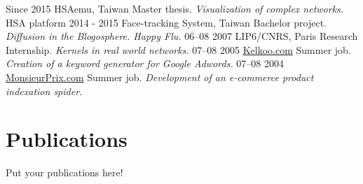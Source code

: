 \documentclass[]{friggeri-cv}
\begin{document}
\begin{entrylist}
  \entry
    {Since 2015}
    {HSAemu, Taiwan}
    {Master thesis.}
    {\emph{Visualization of complex networks.}\\
	HSA platform}
  \entry
    {2014 - 2015}
    {Face-tracking System, Taiwan}
    {Bachelor project.}
    {\emph{Diffusion in the Blogosphere. Happy Flu.}}
  \entry
    {06–08 2007}
    {LIP6/CNRS, Paris}
    {Research Internship.}
    {\emph{Kernels in real world networks.}}
  \entry
    {07–08 2005}
    {\href{http://www.kelkoo.com}{Kelkoo.com}}
    {Summer job.}
    {\emph{Creation of a keyword generator for Google Adwords.}}
  \entry
    {07–08 2004}
    {\href{http://www.monsieurprix.com}{MonsieurPrix.com}}
    {Summer job.}
    {\emph{Development of an e-commerce product indexation spider.}}
\end{entrylist}


\section{Publications}

Put your publications here!

% 
\end{document}
